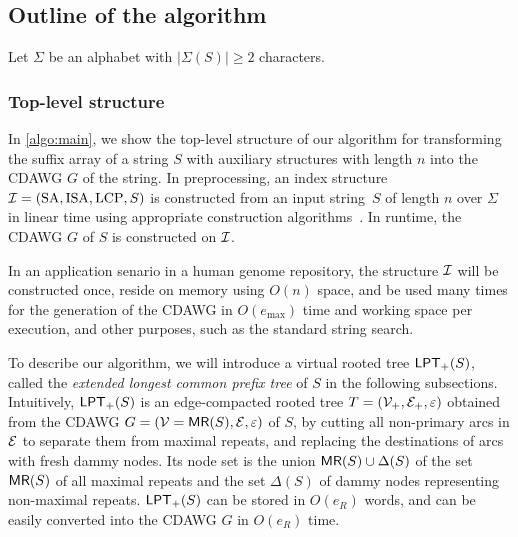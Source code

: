 \documentclass{article}
\begin{document}
\subsection{Outline of the algorithm}
Let $\Sigma$ be an alphabet with $|\Sigma(S)| \ge 2$ characters. 

\subsubsection{Top-level structure}
In \cref{algo:main}, we show the top-level structure of our algorithm for transforming the suffix array of a string $S$ with auxiliary structures with length $n$ into the CDAWG $G$ of the string. In preprocessing, an index structure $\sig I = (\SA, \ISA, \LCP, S)$ is constructed from an input string~$S$ of length $n$ over $\Sigma$ in linear time using appropriate construction algorithms~\cite{navarro2016cds:book,navarro2021indexing:ii}.
In runtime, the CDAWG $G$ of $S$ is constructed on $\sig I$. 

{
\setlength{\algotitleheightrule}{0pt}%
\begin{algorithm}[h]
  \caption{Transforming $SA$ and $S$ into its CDAWG $G$.
  }\label{algo:main}
\end{algorithm}
}

In an application senario in a human genome repository, the structure $\sig I$ will be constructed once, reside on memory using $O(n)$ space, and be used many times for the generation of the CDAWG in $O(e_{\max})$ time and working space per execution, and other purposes, such as the standard string search.

To describe our algorithm, we will introduce a virtual rooted tree $\LPT[+](S)$, called the \textit{extended longest common prefix tree} of $S$ in the following subsections.
Intuitively, $\LPT[+](S)$ is an edge-compacted rooted tree $T = (\sig V_+, \sig E_+, \eps)$ obtained from the CDAWG $G = (\sig V = \MR(S), \sig E, \eps)$ of $S$, by cutting all non-primary arcs in $\sig E$ to separate them from maximal repeats, and replacing the destinations of arcs with fresh dammy nodes. Its node set is the union $\MR(S)\cup \Delta(S)$ of the set $\MR(S)$ of all maximal repeats and the set $\Delta(S)$ of dammy nodes representing non-maximal repeats. $\LPT[+](S)$ can be stored in $O(e_R)$ words, and can be easily converted into the CDAWG $G$ in $O(e_R)$ time. 
\end{document}
